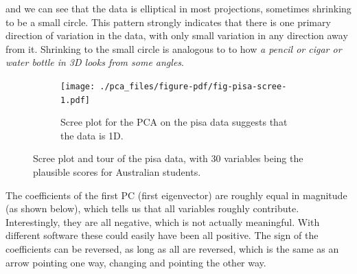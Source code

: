 \documentclass[
  letterpaper,
]{book}
\newenvironment{Shaded}{\begin{snugshade}}{\end{snugshade}}
\newcommand{\DecValTok}[1]{\textcolor[rgb]{0.68,0.00,0.00}{#1}}
\newcommand{\FunctionTok}[1]{\textcolor[rgb]{0.28,0.35,0.67}{#1}}
\newcommand{\NormalTok}[1]{\textcolor[rgb]{0.00,0.23,0.31}{#1}}
\newcommand{\SpecialCharTok}[1]{\textcolor[rgb]{0.37,0.37,0.37}{#1}}
\begin{document}
and we can see that the data is elliptical in most projections,
sometimes shrinking to be a small circle. This pattern strongly
indicates that there is one primary direction of variation in the data,
with only small variation in any direction away from it. Shrinking to
the small circle is analogous to to how \emph{a pencil or cigar or water
bottle in 3D looks from some angles}.

\begin{figure}

\begin{minipage}[t]{0.50\linewidth}

{\centering 

\begin{figure}

{\centering \texttt{[image: ./pca\_files/figure-pdf/fig-pisa-scree-1.pdf]}

}

\caption{Scree plot for the PCA on the pisa data suggests that the data
is 1D.}

\end{figure}

}

\end{minipage}%
%
\begin{minipage}[t]{0.50\linewidth}

{\centering 

}

\end{minipage}%

\caption{\label{fig-pisa-pca}Scree plot and tour of the pisa data, with
30 variables being the plausible scores for Australian students.}

\end{figure}

The coefficients of the first PC (first eigenvector) are roughly equal
in magnitude (as shown below), which tells us that all variables roughly
contribute. Interestingly, they are all negative, which is not actually
meaningful. With different software these could easily have been all
positive. The sign of the coefficients can be reversed, as long as all
are reversed, which is the same as an arrow pointing one way, changing
and pointing the other way.

\begin{Shaded}
\end{Shaded}
\end{document}

